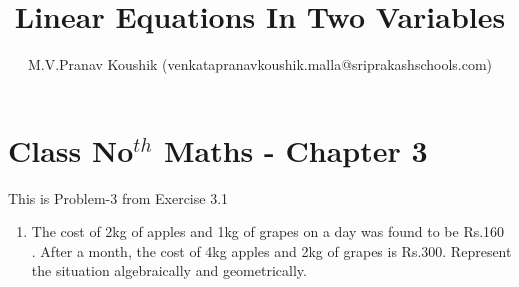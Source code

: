 \documentclass[12pt]{article}
\title{Linear Equations In Two Variables}
\author{M.V.Pranav Koushik (venkatapranavkoushik.malla@sriprakashschools.com)}
\begin{document}
\maketitle
\section*{Class No$^{th}$ Maths - Chapter 3}
This is Problem-3 from Exercise 3.1
\begin{enumerate}
\item The cost of 2kg of apples and 1kg of grapes on a day was found to be  Rs.160 . After a month, the cost of 4kg apples and 2kg of grapes is Rs.300. Represent the situation algebraically and geometrically. \\
\end{enumerate}
\end{document}
